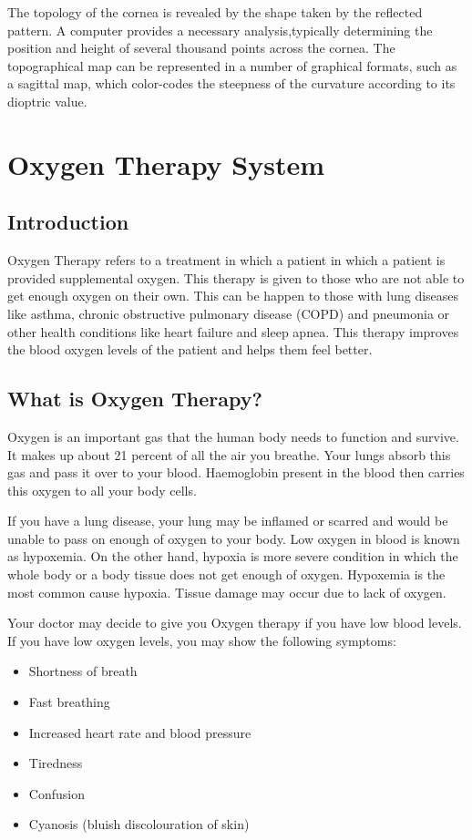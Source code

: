 \documentclass[12pt]{article}
\begin{document}
The topology of the cornea is revealed by the shape taken by the reflected pattern. A computer provides a necessary analysis,typically determining the position and height of several thousand points across the cornea. The topographical map can be represented in a number of graphical formats, such as a sagittal map, which color-codes the steepness of the curvature according to its dioptric value.  
 
\clearpage
 
\section{Oxygen Therapy System}

\subsection{Introduction}
Oxygen Therapy refers to a treatment in which a patient in which a patient is provided supplemental oxygen. This therapy is given to those who are not able to get enough oxygen on their own. This can be happen to those with lung diseases like asthma, chronic obstructive pulmonary disease (COPD) and pneumonia or other health conditions like heart failure and sleep apnea. This therapy improves the blood oxygen levels of the patient and helps them feel better.
 
\subsection{What is Oxygen Therapy?}
Oxygen is an important gas that the human body needs to function and survive. It makes up about 21 percent of all the air you breathe. Your lungs absorb this gas and pass it over to your blood. Haemoglobin present in the blood then carries this oxygen to all your body cells.

If you have a lung disease, your lung may be inflamed or scarred and would be unable to pass  on enough of oxygen to your body. Low oxygen in blood is known as hypoxemia. On the other hand, hypoxia is more severe condition in which the whole body or a body tissue does not get enough of oxygen. Hypoxemia is the most common cause hypoxia. Tissue damage may occur due to lack of oxygen.

Your doctor may decide to give you Oxygen therapy if you have low blood levels. If you have low oxygen levels, you may show the following symptoms:
\begin{itemize}
\item Shortness of breath
\item Fast breathing
\item Increased heart rate and blood pressure
\item Tiredness
\item Confusion
\item Cyanosis (bluish discolouration of skin) 
\end{itemize}
\end{document}
